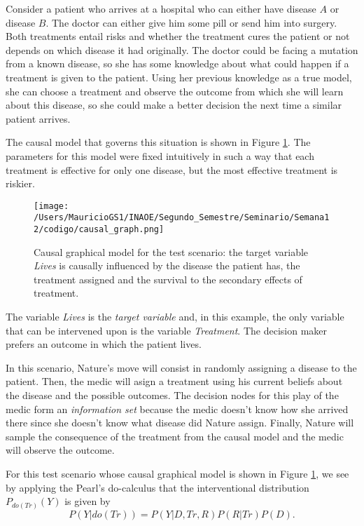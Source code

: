\documentclass{article}
\begin{document}
Consider a patient who arrives at a hospital who can either have disease $A$ or disease $B$. The doctor can either give him some pill or send him into surgery.  Both treatments entail risks and whether the treatment cures the patient or not depends on which disease it had originally. The doctor could be facing a mutation from a known disease, so she has some knowledge about what could happen if a treatment is given to the patient. Using her previous knowledge as a true model, she can choose a treatment and observe the outcome from which she will learn about this disease, so she could make a better decision the next time a similar patient arrives.

The causal model that governs this situation is shown in Figure \ref{causal_model}. The parameters for this model were fixed intuitively in such a way that each treatment is effective for only one disease, but the most effective treatment is riskier.

\begin{figure}[ht]
\vskip 0.2in
\begin{center}
\centerline{\texttt{[image: /Users/MauricioGS1/INAOE/Segundo\_Semestre/Seminario/Semana12/codigo/causal\_graph.png]}}
\caption{Causal graphical model for the test scenario: the target variable \textit{Lives} is causally influenced by the disease the patient has, the treatment assigned and the survival to the secondary effects of treatment.}
\label{causal_model}
\end{center}
\vskip -0.2in
\end{figure}

The variable \textit{Lives} is the \textit{target variable} and, in this example, the only variable that can be intervened upon is the variable \textit{Treatment}. The decision maker prefers an outcome in which the patient lives.

In this scenario, Nature's move will consist in randomly assigning a disease to the patient. Then, the medic will asign a treatment using his current beliefs about the disease and the possible outcomes. The decision nodes for this play of the medic form an \textit{information set} because the medic doesn't know how she arrived there since she doesn't know what disease did Nature assign. Finally, Nature will sample the consequence of the treatment from the causal model and the medic will observe the outcome.

For this test scenario whose causal graphical model is shown in Figure \ref{causal_model}, we see  by applying the Pearl's do-calculus that the interventional distribution $P_{do(Tr)}(Y)$ is given by
\[ P(Y | do(Tr))=P(Y | D, Tr, R)P(R | Tr) P(D). \]
\end{document}
